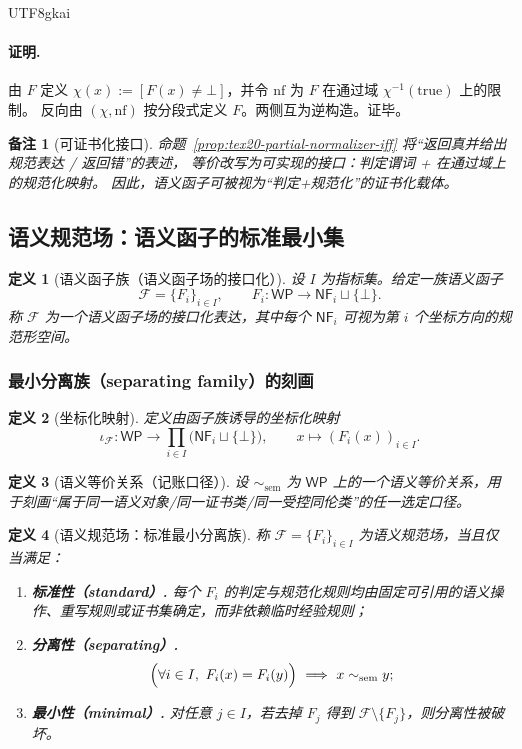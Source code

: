 \documentclass[12pt]{article}
\newtheorem{definition}{定义}[section]
\newtheorem{remark}{备注}[section]
\begin{document}
\begin{CJK*}{UTF8}{gkai}
\paragraph{证明.}
由 $F$ 定义 $\chi(x):=[F(x)\neq \bot]$，并令 $\mathrm{nf}$ 为 $F$ 在通过域 $\chi^{-1}(\mathrm{true})$ 上的限制。
反向由 $(\chi,\mathrm{nf})$ 按分段式定义 $F$。两侧互为逆构造。证毕。

\begin{remark}[可证书化接口]
命题~\ref{prop:tex20-partial-normalizer-iff} 将“返回真并给出规范表达 / 返回错”的表述，
等价改写为可实现的接口：判定谓词 + 在通过域上的规范化映射。
因此，语义函子可被视为“判定+规范化”的证书化载体。
\end{remark}

\subsection{语义规范场：语义函子的标准最小集}
\label{subsec:tex20-semantic-gauge-field}

\begin{definition}[语义函子族（语义函子场的接口化）]
设 $I$ 为指标集。给定一族语义函子
\[
\mathcal{F}=\{F_i\}_{i\in I},
\qquad
F_i:\mathsf{WP}\to \mathsf{NF}_i\sqcup\{\bot\}.
\]
称 $\mathcal{F}$ 为一个语义函子场的接口化表达，其中每个 $\mathsf{NF}_i$ 可视为第 $i$ 个坐标方向的规范形空间。
\end{definition}

\subsubsection{最小分离族（separating family）的刻画}
\label{subsubsec:tex20-separating-family}

\begin{definition}[坐标化映射]
定义由函子族诱导的坐标化映射
\[
\iota_{\mathcal{F}}:\mathsf{WP}\to \prod_{i\in I}\bigl(\mathsf{NF}_i\sqcup\{\bot\}\bigr),
\qquad
x\mapsto (F_i(x))_{i\in I}.
\]
\end{definition}

\begin{definition}[语义等价关系（记账口径）]
设 $\sim_{\mathrm{sem}}$ 为 $\mathsf{WP}$ 上的一个语义等价关系，用于刻画“属于同一语义对象/同一证书类/同一受控同伦类”的任一选定口径。
\end{definition}

\begin{definition}[语义规范场：标准最小分离族]
称 $\mathcal{F}=\{F_i\}_{i\in I}$ 为语义规范场，当且仅当满足：
\begin{enumerate}
  \item \textbf{标准性（standard）.}
  每个 $F_i$ 的判定与规范化规则均由固定可引用的语义操作、重写规则或证书集确定，而非依赖临时经验规则；
  \item \textbf{分离性（separating）.}
  \[
  \Bigl(\forall i\in I,\ F_i(x)=F_i(y)\Bigr)\ \Longrightarrow\ x\sim_{\mathrm{sem}} y;
  \]
  \item \textbf{最小性（minimal）.}
  对任意 $j\in I$，若去掉 $F_j$ 得到 $\mathcal{F}\setminus\{F_j\}$，则分离性被破坏。
\end{enumerate}
\end{definition}


\end{CJK*}
\end{document}
